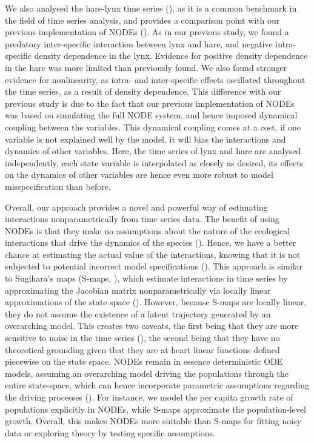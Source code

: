 \documentclass[11pt, oneside]{article}
\begin{document}
We also analysed the hare-lynx time series (\cite{Odum1972}), as it is a common benchmark in the field of time series analysis, and provides a comparison point with our previous implementation of NODEs (\cite{Bonnaffe2021a}).
As in our previous study, we found a predatory inter-specific interaction between lynx and hare, and negative intra-specific density dependence in the lynx.
Evidence for positive density dependence in the hare was more limited than previously found.
We also found stronger evidence for nonlinearity, as intra- and inter-specific effects oscillated throughout the time series, as a result of density dependence.
This difference with our previous study is due to the fact that our previous implementation of NODEs was based on simulating the full NODE system, and hence imposed dynamical coupling between the variables.
This dynamical coupling comes at a cost, if one variable is not explained well by the model, it will bias the interactions and dynamics of other variables.
Here, the time series of lynx and hare are analysed independently, each state variable is interpolated as closely as desired, its effects on the dynamics of other variables are hence even more robust to model misspecification than before.

Overall, our approach provides a novel and powerful way of estimating interactions nonparametrically from time series data.
The benefit of using NODEs is that they make no assumptions about the nature of the ecological interactions that drive the dynamics of the species (\cite{Chen2018,Bonnaffe2021a}). 
Hence, we have a better chance at estimating the actual value of the interactions, knowing that it is not subjected to potential incorrect model specifications (\cite{Jost2000,Ellner2002,Wu2005,Kendall2005,Adamson2013}).
This approach is similar to Sugihara's maps (S-maps, \cite{Sugihara2012}), which estimate interactions in time series by approximating the Jacobian matrix nonparametrically via locally linear approximations of the state space (\cite{Deyle2015}).
However, because S-maps are locally linear, they do not assume the existence of a latent trajectory generated by an overarching model.
This creates two caveats, the first being that they are more sensitive to noise in the time series (\cite{Cenci2018}), the second being that they have no theoretical grounding given that they are at heart linear functions defined piecewise on the state space.
NODEs remain in essence deterministic ODE models, assuming an overarching model driving the populations through the entire state-space, which can hence incorporate parametric assumptions regarding the driving processes (\cite{Bonnaffe2021a}).
For instance, we model the per capita growth rate of populations explicitly in NODEs, while S-maps approximate the population-level growth. 
Overall, this makes NODEs more suitable than S-maps for fitting noisy data or exploring theory by testing specific assumptions.
\end{document}
